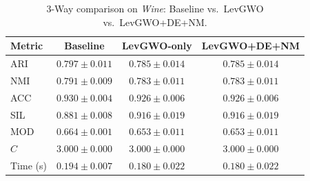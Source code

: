 \begin{table}[htbp]
\centering
\caption{3-Way comparison on \textit{Wine}: Baseline vs.\ LevGWO vs.\ LevGWO+DE+NM.}
\label{tab:wine_3way}
\begin{tabular}{lccc}
\toprule
Metric & Baseline & LevGWO-only & LevGWO+DE+NM \\
\midrule
ARI & $\mathbf{0.797 \pm 0.011}$ & $0.785 \pm 0.014$ & $0.785 \pm 0.014$ \\
NMI & $\mathbf{0.791 \pm 0.009}$ & $0.783 \pm 0.011$ & $0.783 \pm 0.011$ \\
ACC & $\mathbf{0.930 \pm 0.004}$ & $0.926 \pm 0.006$ & $0.926 \pm 0.006$ \\
SIL & $0.881 \pm 0.008$ & $\mathbf{0.916 \pm 0.019}$ & $\mathbf{0.916 \pm 0.019}$ \\
MOD & $\mathbf{0.664 \pm 0.001}$ & $0.653 \pm 0.011$ & $0.653 \pm 0.011$ \\
$C$ & $3.000 \pm 0.000$ & $3.000 \pm 0.000$ & $3.000 \pm 0.000$ \\
Time (s) & $0.194 \pm 0.007$ & $0.180 \pm 0.022$ & $0.180 \pm 0.022$ \\
\bottomrule
\end{tabular}
\end{table}